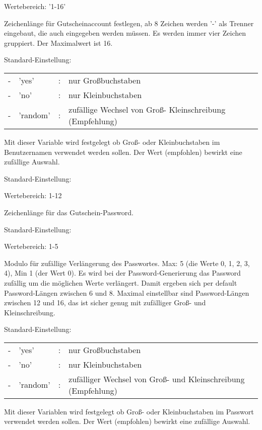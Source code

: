 \begin{description}
   Wertebereich: '1-16'
   
   Zeichenlänge für Gutscheinaccount festlegen, ab 8 Zeichen werden '-' als Trenner eingebaut,
   die auch eingegeben werden müssen. Es werden immer vier Zeichen gruppiert. Der Maximalwert ist 16.
   
   
   Standard-Einstellung: 
   
   \begin{tabular}{rlrl}
    -&'yes'&:&nur Großbuchstaben \\
    -&'no'&:&nur Kleinbuchstaben \\
    -&'random'&:&zufällige Wechsel von Groß- Kleinschreibung (Empfehlung) \\
   \end{tabular}

    Mit dieser Variable wird festgelegt ob Groß- oder Kleinbuchstaben im Benutzernamen verwendet
    werden sollen. Der Wert  (empfohlen) bewirkt eine zufällige Auswahl. 


   Standard-Einstellung: 
   
   Wertebereich: 1-12
   
   Zeichenlänge für das Gutschein-Password.
   

   Standard-Einstellung: 
   
   Wertebereich: 1-5
   
   Modulo für zufällige Verlängerung des Passwortes. Max: 5 (die Werte 0, 1, 2, 3, 4), 
   Min 1 (der Wert 0). Es wird bei der Password-Generierung das Password zufällig um die
   möglichen Werte verlängert. Damit ergeben sich per default Password-Längen zwischen 6 und 8.
   Maximal einstellbar sind Password-Längen zwischen 12 und 16, das ist sicher genug mit zufälliger
   Groß- und Kleinschreibung.


   Standard-Einstellung: 
   
   \begin{tabular}{rlrl}
    -&'yes'&:&nur Großbuchstaben \\
    -&'no'&:&nur Kleinbuchstaben \\
    -&'random'&:&zufälliger Wechsel von Groß- und Kleinschreibung (Empfehlung) \\
   \end{tabular}
   
    Mit dieser Variablen wird festgelegt ob Groß- oder Kleinbuchstaben im Passwort verwendet
    werden sollen. Der Wert  (empfohlen) bewirkt eine zufällige Auswahl.
   
\end{description}
